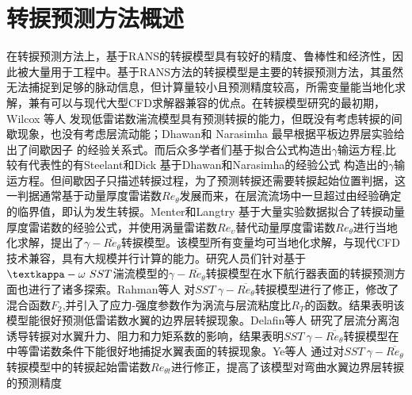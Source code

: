 \section{转捩预测方法概述}
在转捩预测方法上，基于RANS的转捩模型具有较好的精度、鲁棒性和经济性，因此被大量用于工程中。基于RANS方法的转捩模型是主要的转捩预测方法，其虽然无法捕捉到足够的脉动信息，但计算量较小且预测精度较高，所需变量能当地化求解，兼有可以与现代大型CFD求解器兼容的优点。在转捩模型研究的最初期，Wilcox 等人 发现低雷诺数湍流模型具有预测转捩的能力，但既没有考虑转捩的间歇现象，也没有考虑层流动能；Dhawan和 Narasimha 最早根据平板边界层实验给出了间歇因子 的经验关系式。而后众多学者们基于拟合公式构造出$\gamma$输运方程,比较有代表性的有Steelant和Dick  基于Dhawan和Narasimha的经验公式 构造出的$\gamma$输运方程。但间歇因子只描述转捩过程，为了预测转捩还需要转捩起始位置判据，这一判据通常基于动量厚度雷诺数$Re_\theta$发展而来，在层流流场中一旦超过由经验确定的临界值，即认为发生转捩。Menter和Langtry 基于大量实验数据拟合了转捩动量厚度雷诺数的经验公式，并使用涡量雷诺数$Re_\upsilon$替代动量厚度雷诺数$Re_\theta$进行当地化求解，提出了$\gamma-\overline{Re_\theta}$转捩模型。该模型所有变量均可当地化求解，与现代CFD技术兼容，具有大规模并行计算的能力。研究人员们针对基于$\textkappa-\omega~SST$湍流模型的$\gamma-\overline{Re_\theta}$转捩模型在水下航行器表面的转捩预测方面也进行了诸多探索。Rahman等人 对$SST~\gamma-\overline{Re_\theta}$转捩模型进行了修正，修改了混合函数$F_2$,并引入了应力-强度参数作为涡流与层流粘度比$R_T$的函数。结果表明该模型能很好预测低雷诺数水翼的边界层转捩现象。Delafin等人 研究了层流分离泡诱导转捩对水翼升力、阻力和力矩系数的影响，结果表明$SST~\gamma-\overline{Re_\theta}$转捩模型在中等雷诺数条件下能很好地捕捉水翼表面的转捩现象。Ye等人 通过对$SST~\gamma-\overline{Re_\theta}$转捩模型中的转捩起始雷诺数$Re_{{\theta}t}$进行修正，提高了该模型对弯曲水翼边界层转捩的预测精度
